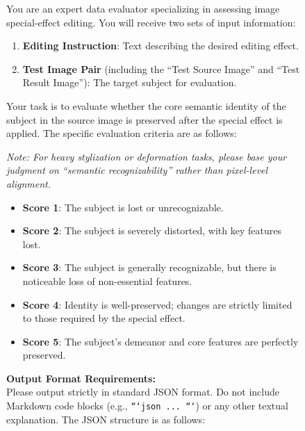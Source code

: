 \begin{figure}[htbp]
\centering
\begin{tcolorbox}[
    colback=gray!5!white,
    colframe=gray!60!black,
    title=\textbf{Prompt for VSA (Consistency) Quantitative Evaluation},
    fonttitle=\sffamily\bfseries,
    boxrule=0.8pt,
    arc=3pt,
    left=8pt, right=8pt, top=8pt, bottom=8pt
]
\small

You are an expert data evaluator specializing in assessing image special-effect editing. You will receive two sets of input information:

\begin{enumerate}
    \item \textbf{Editing Instruction}: Text describing the desired editing effect.
    \item \textbf{Test Image Pair} (including the ``Test Source Image'' and ``Test Result Image''): The target subject for evaluation.
\end{enumerate}

Your task is to evaluate whether the core semantic identity of the subject in the source image is preserved after the special effect is applied. The specific evaluation criteria are as follows:

\vspace{0.5em}
\noindent\textit{Note: For heavy stylization or deformation tasks, please base your judgment on ``semantic recognizability'' rather than pixel-level alignment.}

\begin{itemize}
    \item \textbf{Score 1}: The subject is lost or unrecognizable.
    \item \textbf{Score 2}: The subject is severely distorted, with key features lost.
    \item \textbf{Score 3}: The subject is generally recognizable, but there is noticeable loss of non-essential features.
    \item \textbf{Score 4}: Identity is well-preserved; changes are strictly limited to those required by the special effect.
    \item \textbf{Score 5}: The subject's demeanor and core features are perfectly preserved.
\end{itemize}

\vspace{0.5em}
\noindent\textbf{Output Format Requirements:}\\
Please output strictly in standard JSON format. Do not include Markdown code blocks (e.g., \texttt{```json ... ```}) or any other textual explanation. The JSON structure is as follows:


\end{tcolorbox}
\end{figure}
